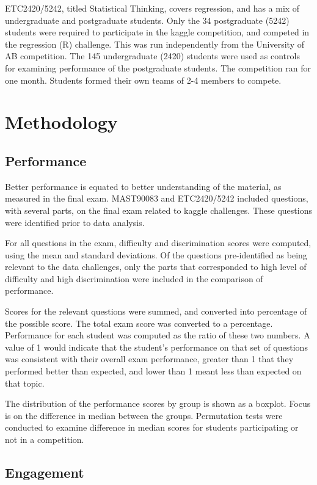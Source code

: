 \documentclass[12pt]{article}
\begin{document}
ETC2420/5242, titled Statistical Thinking, covers regression, and has a
mix of undergraduate and postgraduate students. Only the 34 postgraduate
(5242) students were required to participate in the kaggle competition,
and competed in the regression (R) challenge. This was run independently
from the University of AB competition. The 145 undergraduate (2420)
students were used as controls for examining performance of the
postgraduate students. The competition ran for one month. Students
formed their own teams of 2-4 members to compete.

\section{Methodology}\label{methodology}

\subsection{Performance}\label{performance}

Better performance is equated to better understanding of the material,
as measured in the final exam. MAST90083 and ETC2420/5242 included
questions, with several parts, on the final exam related to kaggle
challenges. These questions were identified prior to data analysis.

For all questions in the exam, difficulty and discrimination scores were
computed, using the mean and standard deviations. Of the questions
pre-identified as being relevant to the data challenges, only the parts
that corresponded to high level of difficulty and high discrimination
were included in the comparison of performance.

Scores for the relevant questions were summed, and converted into
percentage of the possible score. The total exam score was converted to
a percentage. Performance for each student was computed as the ratio of
these two numbers. A value of 1 would indicate that the student's
performance on that set of questions was consistent with their overall
exam performance, greater than 1 that they performed better than
expected, and lower than 1 meant less than expected on that topic.

The distribution of the performance scores by group is shown as a
boxplot. Focus is on the difference in median between the groups.
Permutation tests were conducted to examine difference in median scores
for students participating or not in a competition.

\subsection{Engagement}\label{engagement}
\end{document}
